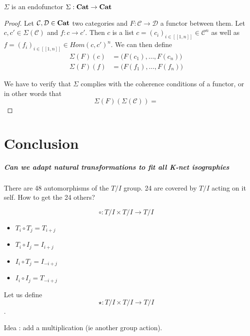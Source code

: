 \documentclass{report}
\begin{document}
\begin{prop}
    $\Sigma$ is an endofunctor $\Sigma : \bf Cat \rightarrow Cat$
\end{prop}

\begin{proof}
    Let $\mathcal{C},\mathcal{D}\in \bf Cat$ two categories and $F : \mathcal{C} \rightarrow \mathcal{D}$ a functor between them. Let $c,c' \in \Sigma(\mathcal{C})$ and $f : c\rightarrow c'$. Then $c$ is a list $c = (c_i)_{i\in[\![1,n]\!]}\in \mathcal{C}^n$ as well as $f = (f_i)_{i\in[\![1,n]\!]}\in Hom(c,c')^n$. We can then define 
    \begin{align*}
        \Sigma(F)(c) &= \big(F(c_1),\dots,F(c_n)\big)\\
        \Sigma(F)(f) &= \big(F(f_1),\dots,F(f_n)\big)
    \end{align*}

    We have to verify that $\Sigma$ complies with the coherence conditions of a functor, or in other words that
    $$\Sigma(F)(\Sigma(\mathcal{C})) =  $$

\end{proof}





\chapter{Conclusion}

\paragraph{Can we adapt natural transformations to fit all K-net isographies}
There are 48 automorphisms of the $T/I$ group. 24 are covered by $T/I$ acting on it self. How to get the 24 others?

$$\circ : T/I \times T/I \rightarrow T/I$$

\begin{itemize}
    \item $T_i \circ T_j = T_{i + j}$
    \item $T_i \circ I_j = I_{i + j}$
    \item $I_i \circ T_j = I_{-i + j}$
    \item $I_i \circ I_j = T_{-i + j}$
\end{itemize}

Let us define
$$\star : T/I \times T/I \rightarrow T/I$$.

Idea : add a multiplication (ie another group action).
\end{document}
